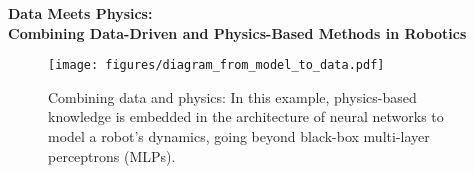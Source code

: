 \documentclass[12pt,a4paper]{article}
\makeatletter
\renewcommand\maketitle{
{\raggedright %
\begin{center}
{\bfseries\uppercase{\Large \@title }}
\end{center}}} %
\makeatother
\begin{document}

\begin{center} 
\linespread{1.5}
\bfseries{\LARGE%
Data Meets Physics:\\Combining Data-Driven and Physics-Based Methods in Robotics}
\end{center}

\begin{figure}[h]
	\centering
	\texttt{[image: figures/diagram\_from\_model\_to\_data.pdf]}
	\caption{Combining data and physics: In this example, physics-based knowledge is embedded in the architecture of neural networks to model a robot's dynamics, going beyond black-box multi-layer perceptrons (MLPs).}
	\label{fig_curvil_coords_3D}
\end{figure}
\end{document}
